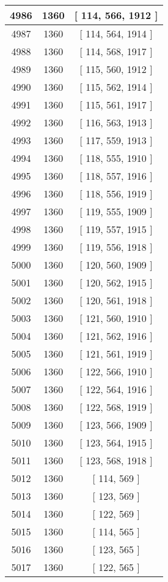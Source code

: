 \begin{center}
\begin{longtable}[H]{|| c c c ||}
\hline
4986 & 1360 & [ 114, 566, 1912 ] \\ 
\hline
4987 & 1360 & [ 114, 564, 1914 ] \\ 
\hline
4988 & 1360 & [ 114, 568, 1917 ] \\ 
\hline
4989 & 1360 & [ 115, 560, 1912 ] \\ 
\hline
4990 & 1360 & [ 115, 562, 1914 ] \\ 
\hline
4991 & 1360 & [ 115, 561, 1917 ] \\ 
\hline
4992 & 1360 & [ 116, 563, 1913 ] \\ 
\hline
4993 & 1360 & [ 117, 559, 1913 ] \\ 
\hline
4994 & 1360 & [ 118, 555, 1910 ] \\ 
\hline
4995 & 1360 & [ 118, 557, 1916 ] \\ 
\hline
4996 & 1360 & [ 118, 556, 1919 ] \\ 
\hline
4997 & 1360 & [ 119, 555, 1909 ] \\ 
\hline
4998 & 1360 & [ 119, 557, 1915 ] \\ 
\hline
4999 & 1360 & [ 119, 556, 1918 ] \\ 
\hline
5000 & 1360 & [ 120, 560, 1909 ] \\ 
\hline
5001 & 1360 & [ 120, 562, 1915 ] \\ 
\hline
5002 & 1360 & [ 120, 561, 1918 ] \\ 
\hline
5003 & 1360 & [ 121, 560, 1910 ] \\ 
\hline
5004 & 1360 & [ 121, 562, 1916 ] \\ 
\hline
5005 & 1360 & [ 121, 561, 1919 ] \\ 
\hline
5006 & 1360 & [ 122, 566, 1910 ] \\ 
\hline
5007 & 1360 & [ 122, 564, 1916 ] \\ 
\hline
5008 & 1360 & [ 122, 568, 1919 ] \\ 
\hline
5009 & 1360 & [ 123, 566, 1909 ] \\ 
\hline
5010 & 1360 & [ 123, 564, 1915 ] \\ 
\hline
5011 & 1360 & [ 123, 568, 1918 ] \\ 
\hline
5012 & 1360 & [ 114, 569 ] \\ 
\hline
5013 & 1360 & [ 123, 569 ] \\ 
\hline
5014 & 1360 & [ 122, 569 ] \\ 
\hline
5015 & 1360 & [ 114, 565 ] \\ 
\hline
5016 & 1360 & [ 123, 565 ] \\ 
\hline
5017 & 1360 & [ 122, 565 ] \\ 

\end{longtable}
\end{center}
